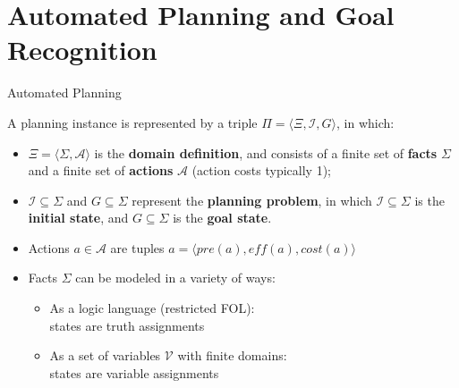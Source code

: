 \documentclass[usenames,dvipsnames]{beamer}
\begin{document}

\section{Automated Planning and Goal Recognition}

\begin{frame}[c]{Automated Planning}
	\begin{definition} 
		A planning instance is represented by a triple $\Pi = \langle \Xi, \mathcal{I}, G\rangle$, in which:
		\begin{itemize}
			\item $\Xi = \langle \Sigma, \mathcal{A} \rangle$ is the \textbf{domain definition}, and consists of a finite set of \textbf{facts} $\Sigma$ and a finite set of \textbf{actions} $\mathcal{A}$ (action costs typically 1);
			\item $\mathcal{I} \subseteq \Sigma$ and $G \subseteq \Sigma$ represent the \textbf{planning problem}, in which $\mathcal{I} \subseteq \Sigma$ is the \textbf{initial state}, and $G \subseteq \Sigma$ is the \textbf{goal state}.
		\end{itemize}
	\end{definition}
	\begin{itemize}
		\item Actions $a \in \mathcal{A}$ are tuples $a = \langle \mathit{pre}(a), \mathit{eff}(a), \mathit{cost}(a) \rangle$
		\item Facts $\Sigma$ can be modeled in a variety of ways:
		\begin{itemize}
			\item As a logic language (restricted FOL): \\states are truth assignments
			\item As a set of variables $\mathcal{V}$ with finite domains: \\states are variable assignments
		\end{itemize}
	\end{itemize}
	
\end{frame}
\end{document}
